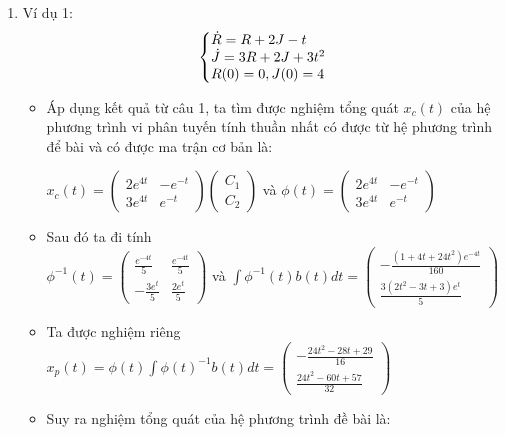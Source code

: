 \documentclass[a4paper]{article}
\begin{document}
\begin{enumerate}
\item Ví dụ 1:   $$\left\{\begin{array}{@{}l@{}}
            \dot{R} = R + 2J - t \\
            \dot{J} =  3R + 2J + 3t^2 \\
            R(0) = 0, J(0) = 4
        \end{array}\right.$$
    \begin{itemize}
    \item Áp dụng kết quả từ câu 1, ta tìm được nghiệm tổng quát $x_c(t)$ của hệ phương trình vi phân tuyến tính thuần nhất có được từ hệ phương trình để bài và có được ma trận cơ bản là:
        \begin{center}
            $x_c(t) = \left( \begin{matrix} 2e^{4t} & -e^{-t} \\ 3e^{4t} & e^{-t} \end{matrix} \right) \left( \begin{matrix} C_1 \\ C_2 \end{matrix} \right)$ và $\phi(t) = \left( \begin{matrix} 2e^{4t} & -e^{-t} \\ 3e^{4t} & e^{-t} \end{matrix} \right)$
        \end{center}
    \item Sau đó ta đi tính \\ $\phi^{-1}(t) = \left( \begin{matrix} \frac{e^{-4t}}{5} & \frac{e^{-4t}}{5} \\[2pt] -\frac{3e^{t}}{5} & \frac{2e^{t}}{5} \end{matrix} \right)$ và $\int\phi^{-1}(t)b(t)dt = \left( \begin{matrix} -\frac{(1+4t+24t^2)e^{-4t}}{160} \\[2pt] \frac{3(2t^2-3t+3)e^t}{5} \end{matrix} \right)$
    \item Ta được nghiệm riêng $ x_p(t) = \phi(t)\int\phi(t)^{-1}b(t)dt = \left( \begin{matrix} -\frac{24t^2-28t+29}{16} \\[2pt] \frac{24t^2-60t+57}{32} \end{matrix} \right)$
    \item Suy ra nghiệm tổng quát của hệ phương trình đề bài là:
        \begin{center}

\end{center}
\end{itemize}
\end{enumerate}
\end{document}
